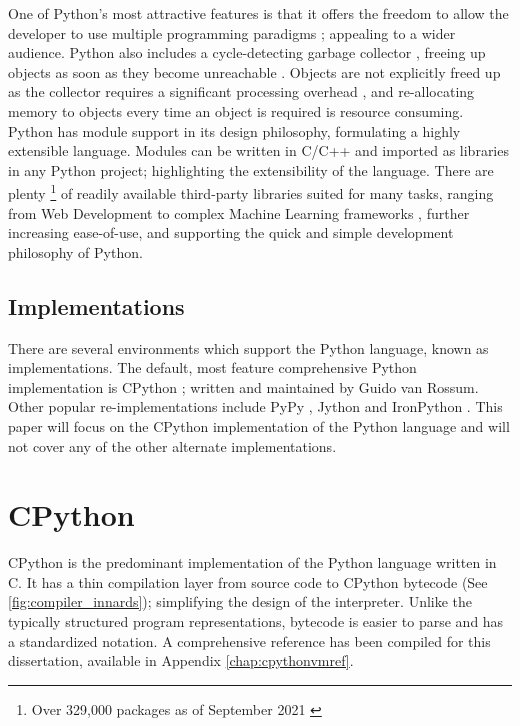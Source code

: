 		\par One of Python's most attractive features is that it offers the freedom to allow the developer to use multiple programming paradigms \cite[]{van2007python}; appealing to a wider audience. Python
		also includes a cycle-detecting garbage collector \cite[]{van2007python}, freeing up objects as soon as they become unreachable \cite[pp.9--10]{van1994python}. Objects are not explicitly freed up
		as the collector requires a significant processing overhead \cite[pp.27-30]{zorn1990barrier}, and re-allocating memory to objects every time an object is required is resource consuming. Python has 
		module support in its design philosophy, formulating a highly extensible language. Modules can be written in C/C++ \cite[]{srinath2017python} and imported as libraries in any Python project;
		highlighting the extensibility of the language. There are plenty \footnote{Over 329,000 packages as of September 2021 \cite[]{van2007python}} of readily available 
		third-party libraries suited for many tasks, ranging from Web Development \cite[]{forcier2008python} to complex Machine Learning frameworks \cite[]{pedregosa2011scikit}, further increasing 
		ease-of-use, and supporting the quick and simple development philosophy of Python.

		\subsection{Implementations}
		\par There are several environments which support the Python language, known as implementations. The default, most feature comprehensive Python implementation is 
		CPython \cite[]{vanrossum1995python}; written and maintained by Guido van Rossum. Other popular re-implementations include PyPy \cite[]{bolz2009tracing}, 
		Jython \cite[]{juneau2010definitive} and IronPython \cite[]{mueller2010professional}. This paper will focus on the CPython implementation of the Python language and
		will not cover any of the other alternate implementations.

	\section{CPython}
		\par CPython is the predominant implementation of the Python language written in C. It has a thin compilation layer from source code to CPython bytecode (See \ref{fig:compiler_innards}); simplifying the design of the interpreter.
		Unlike the typically structured program representations, bytecode is easier to parse and has a standardized notation. A comprehensive reference has been compiled for this dissertation, available in Appendix \ref{chap:cpythonvmref}.
		
